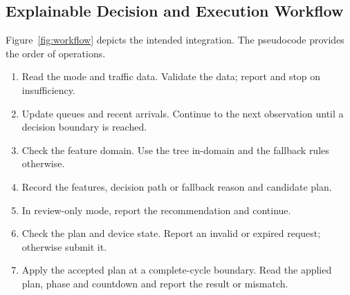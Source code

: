 \subsection{Explainable Decision and Execution Workflow}
Figure~\ref{fig:workflow} depicts the intended integration. The pseudocode provides the order of operations.
\begin{enumerate}
\item Read the mode and traffic data. Validate the data; report and stop on insufficiency.
\item Update queues and recent arrivals. Continue to the next observation until a decision boundary is reached.
\item Check the feature domain. Use the tree in-domain and the fallback rules otherwise.
\item Record the features, decision path or fallback reason and candidate plan.
\item In review-only mode, report the recommendation and continue.
\item Check the plan and device state. Report an invalid or expired request; otherwise submit it.
\item Apply the accepted plan at a complete-cycle boundary. Read the applied plan, phase and countdown and report the result or mismatch.
\end{enumerate}

